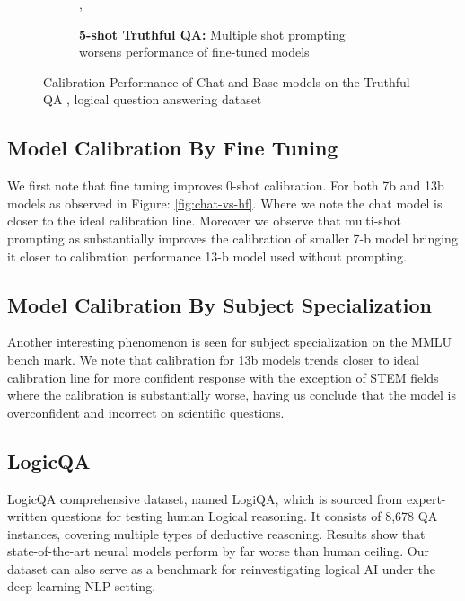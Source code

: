 \documentclass[11pt]{article}
\begin{document}
\begin{figure}
\begin{subfigure}[b]{0.49\textwidth}
             \caption{\textbf{5-shot Truthful QA:}  Multiple shot prompting worsens performance of fine-tuned models},
             \label{fig:0-shot-MMLU}
        \end{subfigure} 
         
         
     
        \caption{Calibration Performance of Chat and Base models on the Truthful QA , logical question answering dataset}
        \label{fig:three graphs}
\end{figure}



\subsection{Model Calibration By Fine Tuning}  

We first note that fine tuning improves 0-shot calibration. For both 7b and 13b models as observed in 
Figure: \ref{fig:chat-vs-hf}. Where we note the chat model is closer to the ideal calibration line. Moreover we observe that 
multi-shot prompting as substantially improves the calibration of smaller 7-b model bringing it closer to calibration performance 13-b model used without prompting.


\subsection{Model Calibration By Subject Specialization}  

Another interesting phenomenon is seen for subject specialization on the MMLU bench mark. We note that calibration for 13b models  trends closer to ideal calibration line for more confident response with the exception of STEM fields where the calibration is substantially worse, having us conclude that the model 
is overconfident and incorrect on scientific questions.

\subsection{LogicQA}

LogicQA comprehensive dataset, named LogiQA, which is sourced from expert-written questions for testing human Logical reasoning. It consists of 8,678 QA instances, covering multiple types of deductive reasoning. Results show that state-of-the-art neural models perform by far worse than human ceiling. Our dataset can also serve as a benchmark for reinvestigating logical AI under the deep learning NLP setting. 
\end{document}

